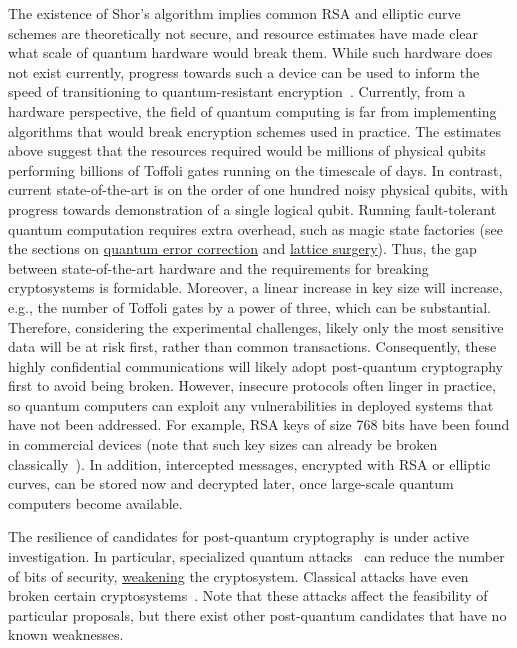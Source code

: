 \begin{refsection}
The existence of Shor's algorithm implies common RSA and elliptic curve schemes are theoretically not secure, and resource estimates have made clear what scale of quantum hardware would break them. While such hardware does not exist currently, progress towards such a device can be used to inform the speed of transitioning to quantum-resistant encryption~\cite{chen2016PostQuantumCrypto}. Currently, from a hardware perspective, the field of quantum computing is far from implementing algorithms that would break encryption schemes used in practice. The estimates above suggest that the resources required would be millions of physical qubits performing billions of Toffoli gates running on the timescale of days. In contrast, current state-of-the-art is on the order of one hundred noisy physical qubits, with progress towards demonstration of a single logical qubit. Running fault-tolerant quantum computation requires extra overhead, such as magic state factories (see the sections on \hyperref[prim:QEC]{quantum error correction} and \hyperref[prim:LatticeSurgery]{lattice surgery}). Thus, the gap between state-of-the-art hardware and the requirements for breaking cryptosystems is formidable. Moreover, a linear increase in key size will increase, e.g., the number of Toffoli gates by a power of three, which can be substantial. Therefore, considering the experimental challenges, likely only the most sensitive data will be at risk first, rather than common transactions. Consequently, these highly confidential communications will likely adopt post-quantum cryptography first to avoid being broken. However, insecure protocols often linger in practice, so quantum computers can exploit any vulnerabilities in deployed systems that have not been addressed. For example, RSA keys of size 768 bits have been found in commercial devices (note that such key sizes can already be broken classically~\cite{boudot2020Factorization240Digit}). In addition, intercepted messages, encrypted with RSA or elliptic curves, can be stored now and decrypted later, once large-scale quantum computers become available.

The resilience of candidates for post-quantum cryptography is under active investigation. In particular, specialized quantum attacks~\cite{peikert2020CSievesCSIDH} can reduce the number of bits of security, \hyperref[appl:WeakeningCrypto]{weakening} the cryptosystem. Classical attacks have even broken certain cryptosystems~\cite{castryck2023EfficientSIDH}. Note that these attacks affect the feasibility of particular proposals, but there exist other post-quantum candidates that have no known weaknesses.


\end{refsection}
